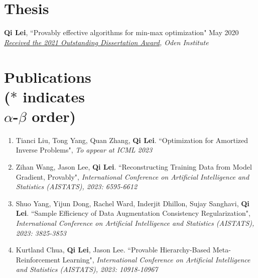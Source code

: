 \documentclass[margin, 10pt]{res} %
\begin{document}
\begin{resume}


\section{Thesis} 
\textbf{Qi Lei}, ``Provably effective algorithms for min-max optimization" \hfill{May 2020} \\ 
\textit{\href{https://www.oden.utexas.edu/news-and-events/news/Oden-Institute-Outstanding-Dissertation-Award-Winner-2021/}{Received the 2021 Outstanding Dissertation Award}, Oden Institute}

\newpage
\section{Publications\\
	\vspace{4pt}
{\footnotesize ($*$ indicates\\ $\alpha$-$\beta$ order) }}
\begin{enumerate}
	
\item{Tianci Liu, Tong Yang, Quan Zhang, \textbf{Qi Lei}. ``Optimization for Amortized Inverse Problems", \textit{To appear at ICML 2023}}
	
\item{Zihan Wang, Jason Lee, \textbf{Qi Lei}. ``Reconstructing Training Data from Model Gradient, Provably", \textit{International Conference on
		Artificial Intelligence and Statistics (AISTATS), 2023: 6595-6612}}
	
\item{Shuo Yang, Yijun Dong, Rachel Ward, Inderjit Dhillon, Sujay Sanghavi, \textbf{Qi Lei}. ``Sample Efficiency of Data Augmentation Consistency Regularization", \textit{International Conference on
			Artificial Intelligence and Statistics (AISTATS), 2023: 3825-3853}}
	
\item{Kurtland Chua, \textbf{Qi Lei}, Jason Lee. ``Provable Hierarchy-Based Meta-Reinforcement Learning", \textit{International Conference on
		Artificial Intelligence and Statistics (AISTATS), 2023: 10918-10967}}
	

\end{enumerate}
\end{resume}
\end{document}

